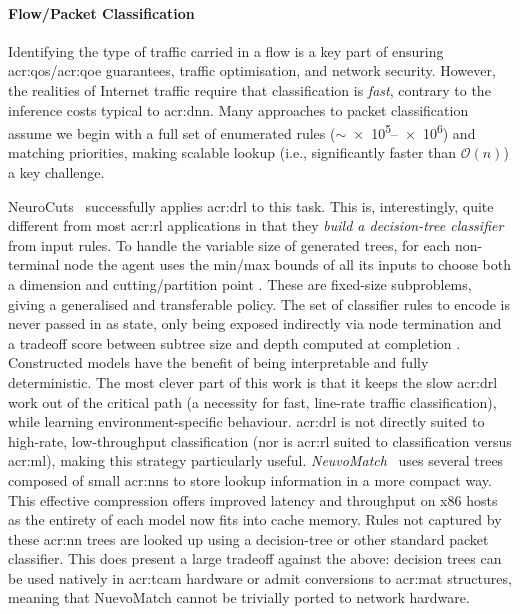 \paragraph{Flow/Packet Classification}
Identifying the type of traffic carried in a flow is a key part of ensuring \gls{acr:qos}/\gls{acr:qoe} guarantees, traffic optimisation, and network security.
However, the realities of Internet traffic require that classification is \emph{fast}, contrary to the inference costs typical to \gls{acr:dnn}.
Many approaches to packet classification assume we begin with a full set of enumerated rules ($\sim$\numrange{e5}{e6}) and matching priorities, making scalable lookup (i.e., significantly faster than $\mathcal{O}\left(n\right)$) a key challenge.

NeuroCuts~\parencite{DBLP:conf/sigcomm/LiangZJS19} successfully applies \gls{acr:drl} to this task.
This is, interestingly, quite different from most \gls{acr:rl} applications in that they \emph{build a decision-tree classifier} from input rules.
To handle the variable size of generated trees, for each non-terminal node the agent uses the min/max bounds of all its inputs \prllitstate{} to choose both a dimension and cutting/partition point \prllitact{}.
These are fixed-size subproblems, giving a generalised and transferable policy.
The set of classifier rules to encode is never passed in as state, only being exposed indirectly via node termination and a tradeoff score between subtree size and depth computed at completion \prllitreward.
Constructed models have the benefit of being interpretable and fully deterministic.
The most clever part of this work is that it keeps the slow \gls{acr:drl} work out of the critical path (a necessity for fast, line-rate traffic classification), while learning environment-specific behaviour.
\gls{acr:drl} is not directly suited to high-rate, low-throughput classification (nor is \gls{acr:rl} suited to classification versus \gls{acr:ml}), making this strategy particularly useful.
\emph{NeuvoMatch}~\parencite{DBLP:conf/sigcomm/RashelbachRS20} uses several trees composed of small \glspl{acr:nn} to store lookup information in a more compact way.
This effective compression offers improved latency and throughput on x86 hosts as the entirety of each model now fits into cache memory.
Rules not captured by these \gls{acr:nn} trees are looked up using a decision-tree or other standard packet classifier.
This does present a large tradeoff against the above: decision trees can be used natively in \gls{acr:tcam} hardware or admit conversions to \gls{acr:mat} structures, meaning that NuevoMatch cannot be trivially ported to network hardware.

